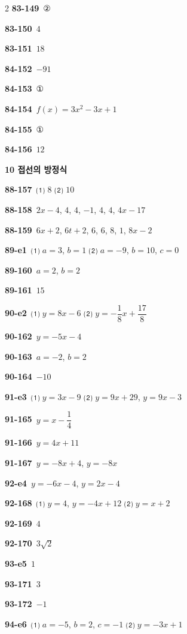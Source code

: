 \documentclass[10pt,a4paper]{article}
\begin{document}
\begin{multicols}{2}
\noindent\textbf{83-149}\ ②\par
\noindent\textbf{83-150}\ $4$\par
\noindent\textbf{83-151}\ $18$\par
\noindent\textbf{84-152}\ $-91$\par
\noindent\textbf{84-153}\ ①\par
\noindent\textbf{84-154}\ $f(x)=3x^2-3x+1$\par
\noindent\textbf{84-155}\ ①\par
\noindent\textbf{84-156}\ $12$\par
\noindent\textbf{10 접선의 방정식}\par\smallskip
\noindent\textbf{88-157}\ ⑴ $8$ ⑵ $10$\par
\noindent\textbf{88-158}\ $2x-4$, $4$, $4$, $-1$, $4$, $4$, $4x-17$\par
\noindent\textbf{88-159}\ $6x+2$, $6t+2$, $6$, $6$, $8$, $1$, $8x-2$\par
\noindent\textbf{89-e1}\ ⑴ $a=3$, $b=1$ ⑵ $a=-9$, $b=10$, $c=0$\par
\noindent\textbf{89-160}\ $a=2$, $b=2$\par
\noindent\textbf{89-161}\ $15$\par
\noindent\textbf{90-e2}\ ⑴ $y=8x-6$ ⑵ $y=-\dfrac{1}{8}x+\dfrac{17}{8}$\par
\noindent\textbf{90-162}\ $y=-5x-4$\par
\noindent\textbf{90-163}\ $a=-2$, $b=2$\par
\noindent\textbf{90-164}\ $-10$\par
\noindent\textbf{91-e3}\ ⑴ $y=3x-9$ ⑵ $y=9x+29$, $y=9x-3$\par
\noindent\textbf{91-165}\ $y=x-\dfrac{1}{4}$\par
\noindent\textbf{91-166}\ $y=4x+11$\par
\noindent\textbf{91-167}\ $y=-8x+4$, $y=-8x$\par
\noindent\textbf{92-e4}\ $y=-6x-4$, $y=2x-4$\par
\noindent\textbf{92-168}\ ⑴ $y=4$, $y=-4x+12$ ⑵ $y=x+2$\par
\noindent\textbf{92-169}\ $4$\par
\noindent\textbf{92-170}\ $3\sqrt{2}$\par
\noindent\textbf{93-e5}\ $1$\par
\noindent\textbf{93-171}\ $3$\par
\noindent\textbf{93-172}\ $-1$\par
\noindent\textbf{94-e6}\ ⑴ $a=-5$, $b=2$, $c=-1$ ⑵ $y=-3x+1$\par

\end{multicols}
\end{document}
